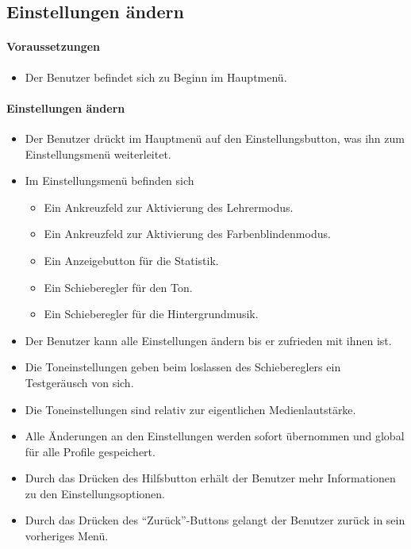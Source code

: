 \subsection{Einstellungen ändern}
\paragraph{Voraussetzungen}
\begin{itemize}
	\item Der Benutzer befindet sich zu Beginn im Hauptmenü.
\end{itemize}
\paragraph{Einstellungen ändern}
\begin{itemize}
	\item Der Benutzer drückt im Hauptmenü auf den Einstellungsbutton, was ihn zum Einstellungsmenü weiterleitet.
	\item Im Einstellungsmenü befinden sich
	\begin{itemize}
		\item Ein Ankreuzfeld zur Aktivierung des Lehrermodus.
		\item Ein Ankreuzfeld zur Aktivierung des Farbenblindenmodus.
		\item Ein Anzeigebutton für die Statistik.
		\item Ein Schieberegler für den Ton.
		\item Ein Schieberegler für die Hintergrundmusik.
	\end{itemize}
	\item Der Benutzer kann alle Einstellungen ändern bis er zufrieden mit ihnen ist.
	\item Die Toneinstellungen geben beim loslassen des Schiebereglers ein Testgeräusch von sich.
	\item Die Toneinstellungen sind relativ zur eigentlichen Medienlautstärke.
	\item Alle Änderungen an den Einstellungen werden sofort übernommen und global für alle Profile gespeichert.
	\item Durch das Drücken des Hilfsbutton erhält der Benutzer mehr Informationen zu den Einstellungsoptionen.
	\item Durch das Drücken des "`Zurück"'-Buttons gelangt der Benutzer zurück in sein vorheriges Menü.
\end{itemize}

